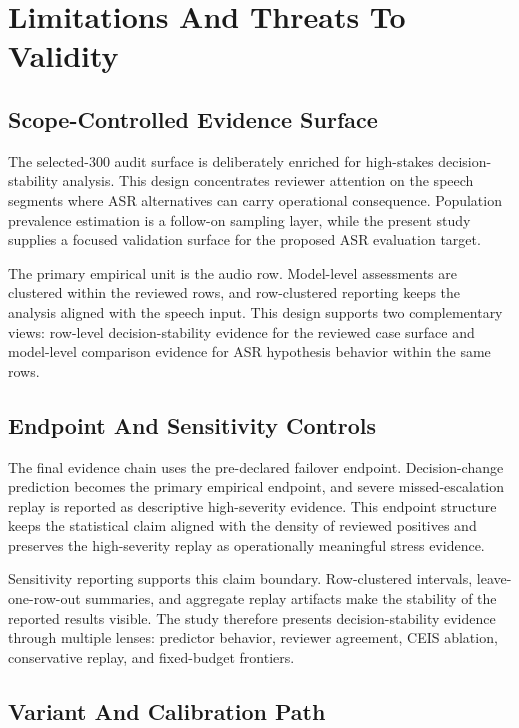 \section{Limitations And Threats To Validity}

\subsection{Scope-Controlled Evidence Surface}

The selected-300 audit surface is deliberately enriched for high-stakes decision-stability analysis. This design concentrates reviewer attention on the speech segments where ASR alternatives can carry operational consequence. Population prevalence estimation is a follow-on sampling layer, while the present study supplies a focused validation surface for the proposed ASR evaluation target.

The primary empirical unit is the audio row. Model-level assessments are clustered within the reviewed rows, and row-clustered reporting keeps the analysis aligned with the speech input. This design supports two complementary views: row-level decision-stability evidence for the reviewed case surface and model-level comparison evidence for ASR hypothesis behavior within the same rows.

\subsection{Endpoint And Sensitivity Controls}

The final evidence chain uses the pre-declared failover endpoint. Decision-change prediction becomes the primary empirical endpoint, and severe missed-escalation replay is reported as descriptive high-severity evidence. This endpoint structure keeps the statistical claim aligned with the density of reviewed positives and preserves the high-severity replay as operationally meaningful stress evidence.

Sensitivity reporting supports this claim boundary. Row-clustered intervals, leave-one-row-out summaries, and aggregate replay artifacts make the stability of the reported results visible. The study therefore presents decision-stability evidence through multiple lenses: predictor behavior, reviewer agreement, CEIS ablation, conservative replay, and fixed-budget frontiers.

\subsection{Variant And Calibration Path}

